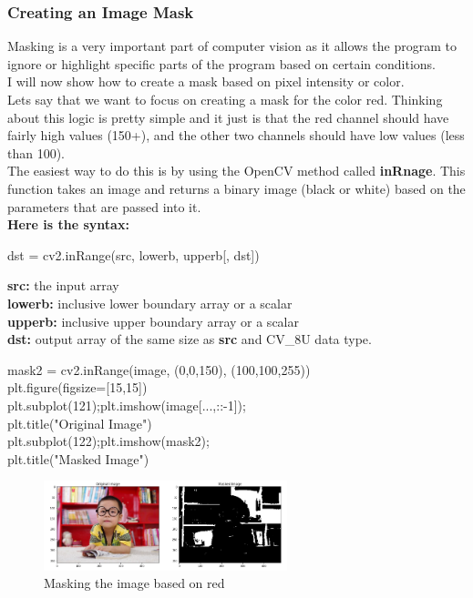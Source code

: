 \documentclass[fleqn]{article}
\begin{document}
    \subsubsection{Creating an Image Mask}
    Masking is a very important part of computer vision as it allows the program to ignore or highlight specific parts of the program based on certain conditions. \\
    I will now show how to create a mask based on pixel intensity or color.\\
    Lets say that we want to focus on creating a mask for the color red. Thinking about this logic is pretty simple and it just is that the red channel should have fairly high values (150+), and the other two channels should have low values (less than 100).\\
    The easiest way to do this is by using the OpenCV method called \textbf{inRnage}. This function takes an image and returns a binary image (black or white) based on the parameters that are passed into it.\\
    \textbf{Here is the syntax: }

    \begin{center}
      dst = cv2.inRange(src, lowerb, upperb[, dst])
    \end{center}

    \textbf{src: }the input array\\
    \indent\textbf{lowerb: }inclusive lower boundary array or a scalar\\
    \indent\textbf{upperb: }inclusive upper boundary array or a scalar\\
    \indent\textbf{dst: }output array of the same size as \textbf{src} and CV\_8U data type.

    \begin{center}
      mask2 = cv2.inRange(image, (0,0,150), (100,100,255))\\
      plt.figure(figsize=[15,15])\\
      plt.subplot(121);plt.imshow(image[...,::-1]);\\
      plt.title("Original Image")\\
      plt.subplot(122);plt.imshow(mask2);\\
      plt.title("Masked Image")\\
    \end{center}

    \begin{figure}[h]
      \centering
      \includegraphics[width=200pt]{maskedimage.png}
      \caption{Masking the image based on red}
      \label{masking}
    \end{figure}
\end{document}
